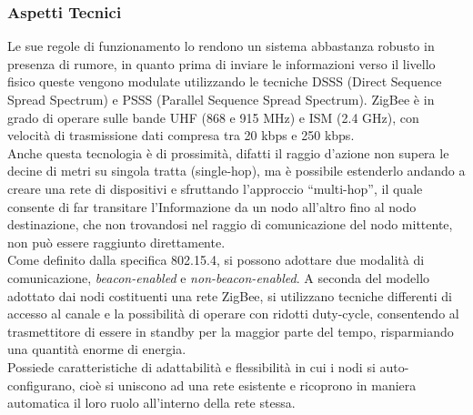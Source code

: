 \subsubsection{Aspetti Tecnici}
Le sue regole di funzionamento lo rendono un sistema abbastanza robusto in presenza di rumore, in quanto prima di inviare le informazioni verso il livello fisico queste vengono modulate utilizzando le tecniche DSSS (Direct Sequence Spread Spectrum) e PSSS (Parallel Sequence Spread Spectrum). %
ZigBee è in grado di operare sulle bande UHF (868 e 915 MHz) e ISM (2.4 GHz), con velocità di trasmissione dati compresa tra 20 kbps e 250 kbps.\\ %
Anche questa tecnologia è di prossimità, difatti il raggio d'azione non supera le decine di metri su singola tratta (single-hop), ma è possibile estenderlo andando a creare una rete di dispositivi e sfruttando l'approccio ``multi-hop'', il quale consente di far transitare l'Informazione da un nodo all'altro fino al nodo destinazione, che non trovandosi nel raggio di comunicazione del nodo mittente, non può essere raggiunto direttamente.\\
Come definito dalla specifica 802.15.4, si possono adottare due modalità di comunicazione, \textit{beacon-enabled} e \textit{non-beacon-enabled}. A seconda del modello adottato dai nodi costituenti una rete ZigBee, si utilizzano tecniche differenti di accesso al canale e la possibilità di operare con ridotti duty-cycle, consentendo al trasmettitore di essere in standby per la maggior parte del tempo, risparmiando una quantità enorme di energia.\\
Possiede caratteristiche di adattabilità e flessibilità in cui i nodi si auto-configurano, cioè si uniscono ad una rete esistente e ricoprono in maniera automatica il loro ruolo all'interno della rete stessa.

